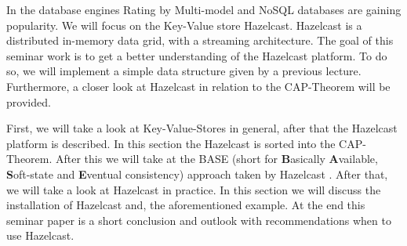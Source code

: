 
In the database engines Rating by \textcite{db-engines} Multi-model and NoSQL
databases are gaining popularity. We will focus on the Key-Value store
Hazelcast. Hazelcast is a distributed in-memory data grid, with a streaming
architecture. The goal of this seminar work is to get a better understanding of
the Hazelcast platform. To do so, we will implement a simple data structure
given by a previous lecture. Furthermore, a closer look at Hazelcast in relation
to the CAP-Theorem \parencite{Brewer2000} will be provided.

First, we will take a look at Key-Value-Stores in general, after that the
Hazelcast platform is described. In this section the Hazelcast is sorted into
the CAP-Theorem. After this we will take at the BASE (short for
\textbf{B}asically \textbf{A}vailable, \textbf{S}oft-state and \textbf{E}ventual
consistency) \parencite{Brewer2000} approach taken by Hazelcast
\parencite{HZfailure}. After that, we will take a look at Hazelcast in practice.
In this section we will discuss the installation of Hazelcast and, the
aforementioned example. At the end this seminar paper is a short
conclusion and outlook with recommendations when to use Hazelcast.